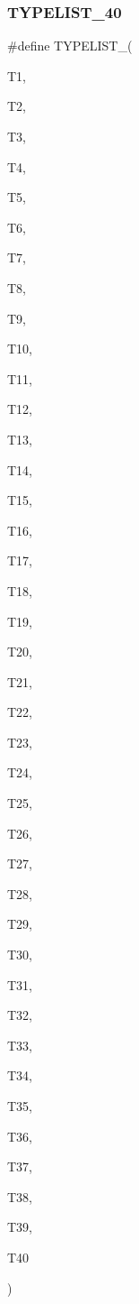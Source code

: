 \subsubsection{\texorpdfstring{TYPELIST\_40}{TYPELIST\_40}}
{\footnotesize\ttfamily \#define T\+Y\+P\+E\+L\+I\+S\+T\+\_(\begin{DoxyParamCaption}\item[{}]{T1,  }\item[{}]{T2,  }\item[{}]{T3,  }\item[{}]{T4,  }\item[{}]{T5,  }\item[{}]{T6,  }\item[{}]{T7,  }\item[{}]{T8,  }\item[{}]{T9,  }\item[{}]{T10,  }\item[{}]{T11,  }\item[{}]{T12,  }\item[{}]{T13,  }\item[{}]{T14,  }\item[{}]{T15,  }\item[{}]{T16,  }\item[{}]{T17,  }\item[{}]{T18,  }\item[{}]{T19,  }\item[{}]{T20,  }\item[{}]{T21,  }\item[{}]{T22,  }\item[{}]{T23,  }\item[{}]{T24,  }\item[{}]{T25,  }\item[{}]{T26,  }\item[{}]{T27,  }\item[{}]{T28,  }\item[{}]{T29,  }\item[{}]{T30,  }\item[{}]{T31,  }\item[{}]{T32,  }\item[{}]{T33,  }\item[{}]{T34,  }\item[{}]{T35,  }\item[{}]{T36,  }\item[{}]{T37,  }\item[{}]{T38,  }\item[{}]{T39,  }\item[{}]{T40 }\end{DoxyParamCaption})}

